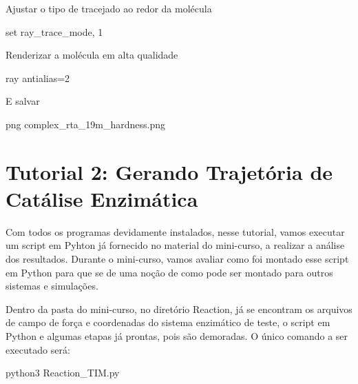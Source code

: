 \documentclass[a4paper,11pt]{refart}
\begin{document}
	Ajustar o tipo de tracejado ao redor da molécula 
	
	
	\hspace*{-\leftmarginwidth}
	\begin{minipage}{\fullwidth}
		\begin{pymol}set ray_trace_mode, 1\end{pymol}
	\end{minipage}

	Renderizar a molécula em alta qualidade

	\hspace*{-\leftmarginwidth}
	\begin{minipage}{\fullwidth}
		\begin{pymol}ray antialias=2\end{pymol}
	\end{minipage}

	E salvar 
	
	\hspace*{-\leftmarginwidth}
	\begin{minipage}{\fullwidth}
		\begin{pymol}png complex_rta_19m_hardness.png\end{pymol}
	\end{minipage}

	
	\section{Tutorial 2: Gerando Trajetória de Catálise Enzimática} 
	
	Com todos os programas devidamente instalados, nesse tutorial, vamos executar um script em Pyhton já fornecido no material do mini-curso, a realizar a análise dos resultados. Durante o mini-curso, vamos avaliar como foi montado esse script em Python para que se de uma noção de como pode ser montado para outros sistemas e simulações. 
	
	Dentro da pasta do mini-curso, no diretório Reaction, já se encontram os arquivos de campo de força e coordenadas do sistema enzimático de teste, o script em Python e algumas etapas já prontas, pois são demoradas. O único comando a ser executado será: 
	
	\hspace*{-\leftmarginwidth}
	\begin{minipage}{\fullwidth}
		\begin{commandshell}python3 Reaction\_TIM.py\end{commandshell}
	\end{minipage}
	
\end{document}
